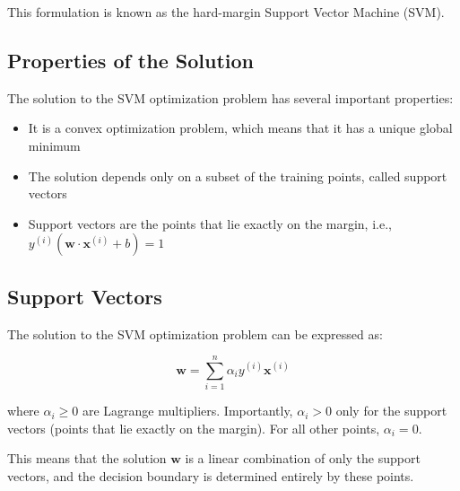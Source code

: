 \documentclass{article}
\begin{document}
This formulation is known as the hard-margin Support Vector Machine (SVM).

\subsection{Properties of the Solution}
The solution to the SVM optimization problem has several important properties:

\begin{itemize}
    \item It is a convex optimization problem, which means that it has a unique global minimum
    \item The solution depends only on a subset of the training points, called support vectors
    \item Support vectors are the points that lie exactly on the margin, i.e., $y^{(i)}(\mathbf{w} \cdot \mathbf{x}^{(i)} + b) = 1$
\end{itemize}

\subsection{Support Vectors}
The solution to the SVM optimization problem can be expressed as:

\[
\mathbf{w} = \sum_{i=1}^{n} \alpha_i y^{(i)} \mathbf{x}^{(i)}
\]

where $\alpha_i \geq 0$ are Lagrange multipliers. Importantly, $\alpha_i > 0$ only for the support vectors (points that lie exactly on the margin). For all other points, $\alpha_i = 0$.

This means that the solution $\mathbf{w}$ is a linear combination of only the support vectors, and the decision boundary is determined entirely by these points.
\end{document}
